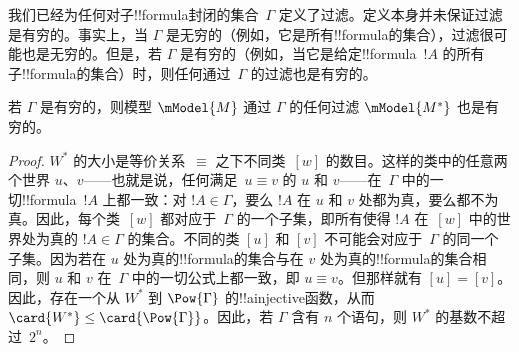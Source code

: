 \documentclass[../../../include/open-logic-section]{subfiles}
\begin{document}


我们已经为任何对子!!{formula}封闭的集合~$\Gamma$ 定义了过滤。定义本身并未保证过滤是有穷的。事实上，当 $\Gamma$ 是无穷的（例如，它是所有!!{formula}的集合），过滤很可能也是无穷的。但是，若 $\Gamma$ 是有穷的（例如，当它是给定!!{formula}~$!A$ 的所有子!!{formula}的集合）时，则任何通过~$\Gamma$ 的过滤也是有穷的。

\begin{prop}
  若 $\Gamma$ 是有穷的，则模型 $\mModel{M}$ 通过 $\Gamma$ 的任何过滤 $\mModel{M^*}$ 也是有穷的。
\end{prop}

\begin{proof}
  $W^*$ 的大小是等价关系~$\equiv$ 之下不同类~$[w]$ 的数目。这样的类中的任意两个世界 $u$、$v$——也就是说，任何满足~$u \equiv v$ 的 $u$ 和 $v$——在~$\Gamma$ 中的一切!!{formula}~$!A$ 上都一致：对 $!A \in \Gamma$，要么 $!A$ 在 $u$ 和 $v$ 处都为真，要么都不为真。因此，每个类~$[w]$ 都对应于~$\Gamma$ 的一个子集，即所有使得 $!A$ 在~$[w]$ 中的世界处为真的 $!A \in \Gamma$ 的集合。不同的类 $[u]$ 和 $[v]$ 不可能会对应于~$\Gamma$ 的同一个子集。因为若在 $u$ 处为真的!!{formula}的集合与在 $v$ 处为真的!!{formula}的集合相同，则 $u$ 和 $v$ 在~$\Gamma$ 中的一切公式上都一致，即 $u \equiv v$。但那样就有 $[u] = [v]$。因此，存在一个从 $W^*$ 到 $\Pow{\Gamma}$ 的!!a{injective}函数，从而 $\card{W^*} \le \card{\Pow{\Gamma}}$。因此，若 $\Gamma$ 含有 $n$ 个语句，则 $W^*$ 的基数不超过~$2^n$。
\end{proof}
\end{document}
